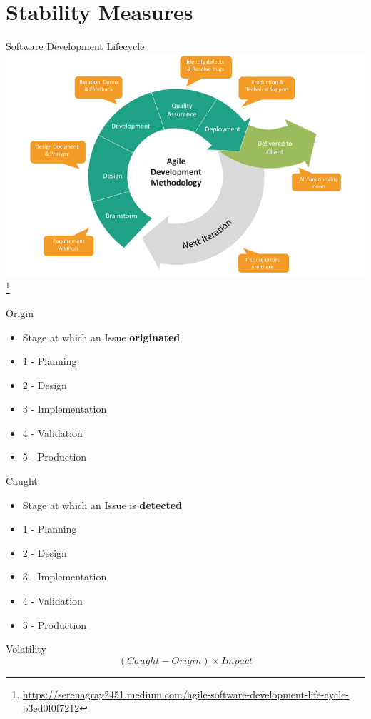 \documentclass[aspectratio=169]{beamer}
\begin{document}
\section{Stability Measures}
\begin{frame}{Software Development Lifecycle}
    \centering
    \includegraphics[width=\textwidth,height=0.7\textheight,keepaspectratio]{agile_sdlc.png} \footnote{\url{https://serenagray2451.medium.com/agile-software-development-life-cycle-b3ed0f0f7212}}
\end{frame}
\begin{frame}{Origin}
    \begin{itemize}
        \item Stage at which an Issue \textbf{originated} 
        \item 1 - Planning
        \item 2 - Design
        \item 3 - Implementation
        \item 4 - Validation
        \item 5 - Production
    \end{itemize}
\end{frame}
\begin{frame}{Caught}
    \begin{itemize}
        \item Stage at which an Issue is \textbf{detected}
        \item 1 - Planning
        \item 2 - Design
        \item 3 - Implementation
        \item 4 - Validation
        \item 5 - Production
    \end{itemize}
\end{frame}
\begin{frame}{Volatility}
    $$(Caught - Origin) \times Impact$$
\end{frame}
\end{document}
